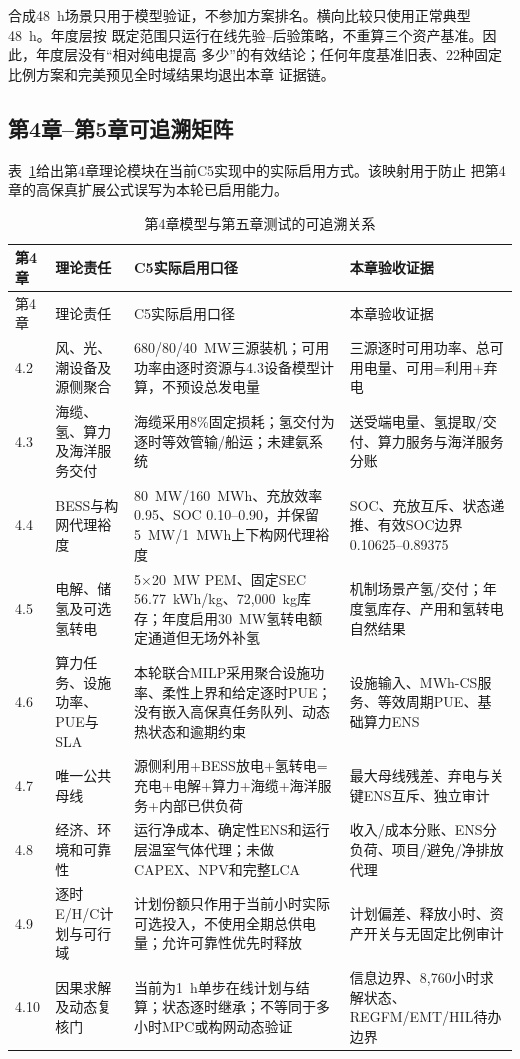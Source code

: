 合成48~h场景只用于模型验证，不参加方案排名。横向比较只使用正常典型48~h。年度层按
既定范围只运行在线先验--后验策略，不重算三个资产基准。因此，年度层没有“相对纯电提高
多少”的有效结论；任何年度基准旧表、22种固定比例方案和完美预见全时域结果均退出本章
证据链。

\subsection{第4章--第5章可追溯矩阵}

表~\ref{tab:c4-c5-trace}给出第4章理论模块在当前C5实现中的实际启用方式。该映射用于防止
把第4章的高保真扩展公式误写为本轮已启用能力。

\begin{longtable}{p{1.4cm}p{3.0cm}p{5.6cm}p{4.0cm}}
\caption{第4章模型与第五章测试的可追溯关系}\label{tab:c4-c5-trace}\\
\toprule
第4章 & 理论责任 & C5实际启用口径 & 本章验收证据\\
\midrule
\endfirsthead
\toprule
第4章 & 理论责任 & C5实际启用口径 & 本章验收证据\\
\midrule
\endhead
4.2 & 风、光、潮设备及源侧聚合 & 680/80/40~MW三源装机；可用功率由逐时资源与4.3设备模型计算，不预设总发电量 & 三源逐时可用功率、总可用电量、可用=利用+弃电\\
4.3 & 海缆、氢、算力及海洋服务交付 & 海缆采用8\%固定损耗；氢交付为逐时等效管输/船运；未建氨系统 & 送受端电量、氢提取/交付、算力服务与海洋服务分账\\
4.4 & BESS与构网代理裕度 & 80~MW/160~MWh、充放效率0.95、SOC 0.10--0.90，并保留5~MW/1~MWh上下构网代理裕度 & SOC、充放互斥、状态递推、有效SOC边界0.10625--0.89375\\
4.5 & 电解、储氢及可选氢转电 & 5$\times$20~MW PEM、固定SEC 56.77~kWh/kg、72,000~kg库存；年度启用30~MW氢转电额定通道但无场外补氢 & 机制场景产氢/交付；年度氢库存、产用和氢转电自然结果\\
4.6 & 算力任务、设施功率、PUE与SLA & 本轮联合MILP采用聚合设施功率、柔性上界和给定逐时PUE；没有嵌入高保真任务队列、动态热状态和逾期约束 & 设施输入、MWh-CS服务、等效周期PUE、基础算力ENS\\
4.7 & 唯一公共母线 & 源侧利用+BESS放电+氢转电=充电+电解+算力+海缆+海洋服务+内部已供负荷 & 最大母线残差、弃电与关键ENS互斥、独立审计\\
4.8 & 经济、环境和可靠性 & 运行净成本、确定性ENS和运行层温室气体代理；未做CAPEX、NPV和完整LCA & 收入/成本分账、ENS分负荷、项目/避免/净排放代理\\
4.9 & 逐时E/H/C计划与可行域 & 计划份额只作用于当前小时实际可选投入，不使用全期总供电量；允许可靠性优先时释放 & 计划偏差、释放小时、资产开关与无固定比例审计\\
4.10 & 因果求解及动态复核门 & 当前为1~h单步在线计划与结算；状态逐时继承；不等同于多小时MPC或构网动态验证 & 信息边界、8,760小时求解状态、REGFM/EMT/HIL待办边界\\
\bottomrule
\end{longtable}

